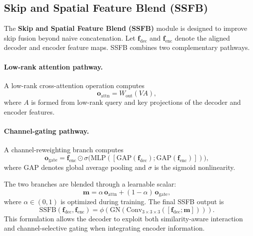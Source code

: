 \documentclass[conference]{IEEEtran}
\begin{document}
\subsection{Skip and Spatial Feature Blend (SSFB)}
\label{sec:ssfb}

The \textbf{Skip and Spatial Feature Blend (SSFB)} module is designed to improve skip fusion beyond naive concatenation. Let $\mathbf{f}_{\mathrm{dec}}$ and $\mathbf{f}_{\mathrm{enc}}$ denote the aligned decoder and encoder feature maps. SSFB combines two complementary pathways.

\paragraph{Low-rank attention pathway.}
A low-rank cross-attention operation computes
\begin{equation}
\mathbf{o}_{\mathrm{attn}} = W_{\mathrm{out}}(VA),
\end{equation}
where $A$ is formed from low-rank query and key projections of the decoder and encoder features.

\paragraph{Channel-gating pathway.}
A channel-reweighting branch computes
\[
\mathbf{o}_{\mathrm{gate}} = \mathbf{f}_{\mathrm{enc}} \odot \sigma\big( \mathrm{MLP}( [\mathrm{GAP}(\mathbf{f}_{\mathrm{dec}}); \mathrm{GAP}(\mathbf{f}_{\mathrm{enc}})] ) \big),
\]
where $\mathrm{GAP}$ denotes global average pooling and $\sigma$ is the sigmoid nonlinearity.

The two branches are blended through a learnable scalar:
\begin{equation}
\mathbf{m} = \alpha \, \mathbf{o}_{\mathrm{attn}} + (1-\alpha) \, \mathbf{o}_{\mathrm{gate}},
\end{equation}
where $\alpha \in (0,1)$ is optimized during training. The final SSFB output is
\begin{equation}
\mathrm{SSFB}(\mathbf{f}_{\mathrm{dec}}, \mathbf{f}_{\mathrm{enc}}) = \phi\!\left(\mathrm{GN}\!\left(\mathrm{Conv}_{3\times3\times3}([\mathbf{f}_{\mathrm{dec}};\mathbf{m}])\right)\right).
\end{equation}
This formulation allows the decoder to exploit both similarity-aware interaction and channel-selective gating when integrating encoder information.

\end{document}
